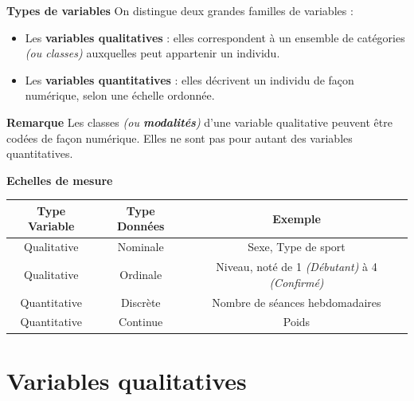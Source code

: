 \documentclass[aspectratio=169,xcolor=dvipsnames]{beamer}
\begin{document}
\begin{frame}
	\begin{block}{\textbf{Types de variables}}
	On distingue deux grandes familles de variables :
		\begin{itemize}
		\item Les \textbf{variables qualitatives} : elles correspondent à un ensemble de catégories \emph{(ou classes)} auxquelles peut appartenir un individu.
		\item Les \textbf{variables quantitatives} : elles décrivent un individu de façon numérique, selon une échelle ordonnée.
		\end{itemize}
	\end{block}
	
	\medskip
	
	\begin{exampleblock}{\textbf{Remarque}}
	Les classes \emph{(ou \textbf{modalités})} d'une variable qualitative peuvent être codées de façon numérique. Elles ne sont pas pour autant des variables quantitatives.
	\end{exampleblock}
\end{frame}

\begin{frame}
	\begin{block}{\textbf{Echelles de mesure}}
		\begin{center}
		\begin{tabular}{ccc}
		\textbf{Type Variable} & \textbf{Type Données} & \textbf{Exemple} \\
		\hline
		Qualitative & Nominale & Sexe, Type de sport \\
		Qualitative & Ordinale & Niveau, noté de 1 \emph{(Débutant)} à 4 \emph{(Confirmé)} \\
		Quantitative & Discrète & Nombre de séances hebdomadaires \\
		Quantitative & Continue & Poids \\
		\hline 
		\end{tabular}
		\end{center}
	\end{block}
\end{frame}

\section{Variables qualitatives}
\end{document}
